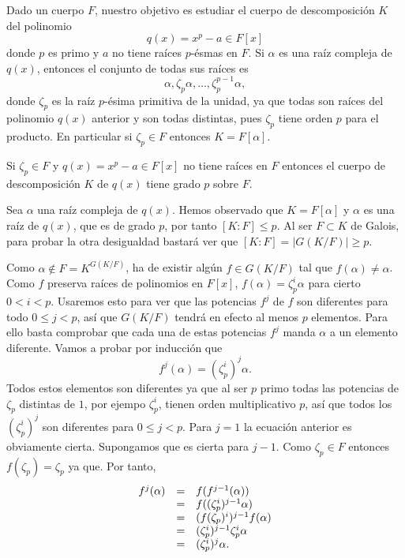 Dado un cuerpo \(F\), nuestro objetivo es estudiar el cuerpo de
descomposición \(K\) del polinomio \[q(x)=x^p-a\in F[x]\] donde \(p\) es
primo y \(a\) no tiene raíces \(p\)-ésmas en \(F\). Si \(\alpha\) es una
raíz compleja de \(q(x)\), entonces el conjunto de todas sus raíces es
\[\alpha,\zeta_p\alpha,\dots,\zeta_p^{p-1}\alpha,\] donde \(\zeta_p\)
es la raíz \(p\)-ésima primitiva de la unidad, ya que todas son raíces
del polinomio \(q(x)\) anterior y son todas distintas, pues \(\zeta_p\)
tiene orden \(p\) para el producto. En particular si \(\zeta_p\in F\)
entonces \(K=F[\alpha]\).


Si \(\zeta_p\in F\) y \(q(x)=x^p-a\in F[x]\) no tiene raíces en \(F\)
entonces el cuerpo de descomposición \(K\) de \(q(x)\) tiene grado \(p\)
sobre \(F\). 


Sea \(\alpha\) una raíz compleja de \(q(x)\). Hemos observado que
\(K=F[\alpha]\) y \(\alpha\) es una raíz de \(q(x)\), que es de grado
\(p\), por tanto \([K:F]\leq p\). Al ser \(F\subset K\) de Galois, para
probar la otra desigualdad bastará ver que \([K:F]=|G(K/F)|\geq p\).

Como \(\alpha\notin F= K^{G(K/F)}\), ha de existir algún \(f\in G(K/F)\)
tal que \(f(\alpha)\neq\alpha\). Como \(f\) preserva raíces de
polinomios en \(F[x]\), \(f(\alpha)=\zeta_p^i\alpha\) para cierto
\(0{<}i{<}p\). Usaremos esto para ver que las potencias \(f^j\) de \(f\)
son diferentes para todo \(0\leq j{<}p\), así que \(G(K/F)\) tendrá en
efecto al menos \(p\) elementos. Para ello basta comprobar que cada una
de estas potencias \(f^j\) manda \(\alpha\) a un elemento diferente.
Vamos a probar por inducción que
\[f^j(\alpha)=(\zeta_p^{i})^{j}\alpha.\] Todos estos elementos son
diferentes ya que al ser \(p\) primo todas las potencias de \(\zeta_p\)
distintas de \(1\), por ejempo \(\zeta_p^i\), tienen orden
multiplicativo \(p\), así que todos los \((\zeta_p^i)^{j}\) son
diferentes para \(0\leq j{<}p\). Para \(j=1\) la ecuación anterior es
obviamente cierta. Supongamos que es cierta para \(j-1\). Como
\(\zeta_p\in F\) entonces \(f(\zeta_p)=\zeta_p\) ya que. Por tanto,
\[\begin{array}{rcl}
f^j(\alpha)&=&f(f^{j-1}(\alpha))\cr
&=&f((\zeta_p^{i})^{j-1}\alpha)\cr
&=&(f(\zeta_p)^{i})^{j-1}f(\alpha)\cr
&=&(\zeta_p^{i})^{j-1}\zeta_p^i\alpha\cr
&=&(\zeta_p^{i})^{j}\alpha.
\end{array}\] 

